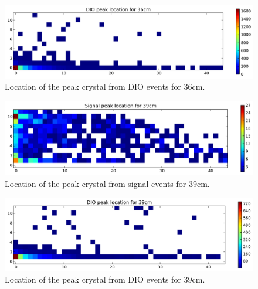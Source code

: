 \documentclass[11pt]{article}
\begin{document}
\begin{figure}[htbp]
   \centering
   \includegraphics[width=\textwidth]{../plot/dio_peak_loc_36.pdf} %
   \caption{Location of the peak crystal from DIO events for 36cm.}
   \label{fig:dio_peak_loc_36}
\end{figure}

\begin{figure}[htbp]
   \centering
   \includegraphics[width=\textwidth]{../plot/sig_peak_loc_39.pdf} %
   \caption{Location of the peak crystal from signal events for 39cm.}
   \label{fig:sig_peak_loc_39}
\end{figure}

\begin{figure}[htbp]
   \centering
   \includegraphics[width=\textwidth]{../plot/dio_peak_loc_39.pdf} %
   \caption{Location of the peak crystal from DIO events for 39cm.}
   \label{fig:dio_peak_loc_39}
\end{figure}
\end{document}
